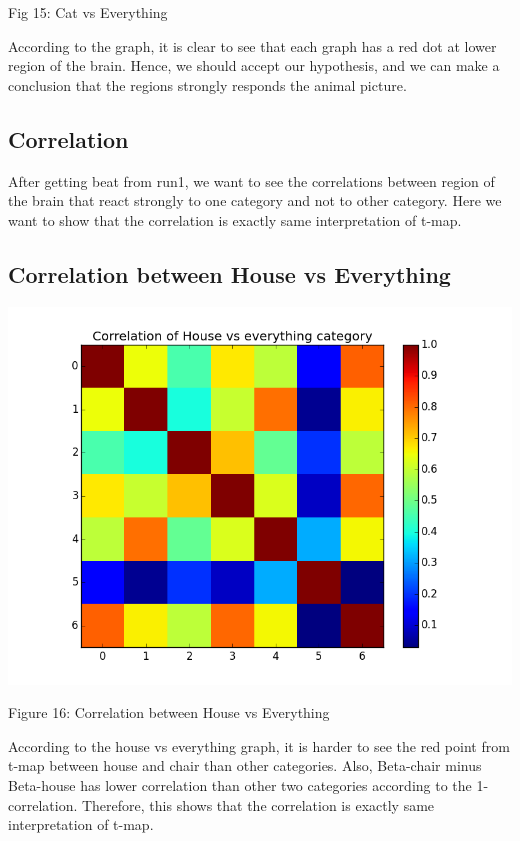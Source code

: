 \documentclass[12pt]{article}
\begin{document}
\begin{housevseverything}
\begin{housevseverything}
        Fig 15: Cat vs Everything

According to the graph, it is clear to see that each graph has a red dot at lower region of the brain. Hence, we should accept our hypothesis, and we can make a conclusion that the regions strongly responds the animal picture.

\subsection{Correlation}

After getting beat from run1, we want to see the correlations between  region of the brain that react strongly to one category and not to other category. Here we want to show that the correlation is exactly same interpretation  of t-map.


\subsection{Correlation between House vs Everything}
\begin{housevseverything}
    \centering
      \includegraphics{corr_House_vs_everything}
    \caption{Figure 16: Correlation between House vs Everything}
\end{housevseverything}

According to the house vs everything graph, it is harder to see the red point from t-map between house and chair than other categories. Also, Beta-chair  minus Beta-house has lower correlation than other two categories according to the 1-correlation. Therefore,  this shows that the correlation is exactly same interpretation  of t-map. 


\end{housevseverything}
\end{housevseverything}
\end{document}
